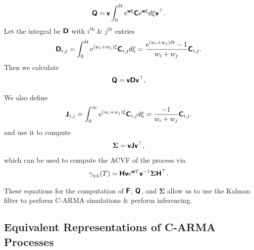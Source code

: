 \documentclass[a4paper,fleqn,usenatbib]{mnras}
\begin{document}
\begin{equation}\label{eq:DistMat3}
\textbf{\textsf{Q}} = \textbf{\textsf{v}} \int_{0}^{\delta t} \mathrm{e}^{\textbf{\textsf{w}}\xi}\textbf{\textsf{C}}\mathrm{e}^{\textbf{\textsf{w}}\xi} d\xi \textbf{\textsf{v}}^{\top}.
\end{equation}
Let the integral be $\textbf{\textsf{D}}$ with $i^{\mathrm{th}}$ \& $j^{\mathrm{th}}$ entries
\begin{equation}\label{eq:DistMat4}
\textbf{\textsf{D}}_{i,j} = \int_{0}^{\delta t} \mathrm{e}^{(w_{i} + w_{j})\xi} \textbf{\textsf{C}}_{i,j} d\xi = \frac{\mathrm{e}^{(w_{i} + w_{j})\delta t} - 1}{w_{i} + w_{j}}\textbf{\textsf{C}}_{i,j} .
\end{equation}
Then we calculate
\begin{equation}\label{eq:DistMat5}
\textbf{\textsf{Q}} = \textbf{\textsf{v}}\textbf{\textsf{D}}\textbf{\textsf{v}}^{\top},
\end{equation}

We also define
\begin{equation}\label{eq:DistMat6}
\textbf{\textsf{J}}_{i,j} = \int_{0}^{\infty} \mathrm{e}^{(w_{i} + w_{j})\xi} \textbf{\textsf{C}}_{i,j} d\xi = \frac{ - 1}{w_{i} + w_{j}}\textbf{\textsf{C}}_{i,j}.
\end{equation}
and use it to compute
\begin{equation}\label{eq:Sigma}
\boldsymbol{\Sigma} = \textbf{\textsf{v}}\textbf{\textsf{J}}\textbf{\textsf{v}}^{\top},
\end{equation}
which can be used to compute the ACVF of the process via \citep{DimensionEstimationBrockwell}
\begin{equation}\label{eq:ACVFStateSpace}
\gamma_{\chi\chi}(T) = \textbf{\textsf{H}} \textbf{\textsf{v}}\mathrm{e}^{\textbf{\textsf{w}}T}\textbf{\textsf{v}}^{-1} \boldsymbol{\Sigma}\textbf{\textsf{H}}^{\top}.
\end{equation}

These equations for the computation of $\textbf{\textsf{F}}$, $\textbf{\textsf{Q}}$, and $\boldsymbol{\Sigma}$ allow us to use the Kalman filter to perform C-ARMA simulations \& perform inferencing.

\subsection[Representations]{Equivalent Representations of C-ARMA Processes}
\end{document}
